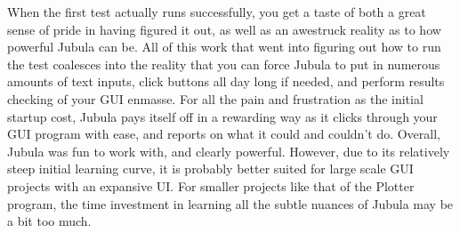 \documentclass{article}
\begin{document}
When the first test actually runs successfully, you get a taste of both a great sense of pride in having figured it out, as well as an awestruck reality as to how powerful Jubula can be. All of this work that went into figuring out how to run the test coalesces into the reality that you can force Jubula to put in numerous amounts of text inputs, click buttons all day long if needed, and perform results checking of your GUI enmasse. For all the pain and frustration as the initial startup cost, Jubula pays itself off in a rewarding way as it clicks through your GUI program with ease, and reports on what it could and couldn't do. Overall, Jubula was fun to work with, and clearly powerful. However, due to its relatively steep initial learning curve, it is probably better suited for large scale GUI projects with an expansive UI. For smaller projects like that of the Plotter program, the time investment in learning all the subtle nuances of Jubula may be a bit too much. 
\end{document}
